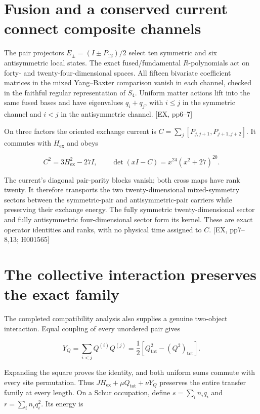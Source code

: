\section{Fusion and a conserved current connect composite channels}\label{fusion-and-a-conserved-current-connect-composite-channels}

The pair projectors \(E_\pm=(I\pm P_{12})/2\) select ten symmetric and six antisymmetric local states. The exact fused/fundamental \(R\)-polynomials act on forty- and twenty-four-dimensional spaces. All fifteen bivariate coefficient matrices in the mixed Yang--Baxter comparison vanish in each channel, checked in the faithful regular representation of \(S_4\). Uniform matter actions lift into the same fused bases and have eigenvalues \(q_i+q_j\), with \(i\le j\) in the symmetric channel and \(i<j\) in the antisymmetric channel. {[}EX, pp6--7{]}

On three factors the oriented exchange current is \(C=\sum_j[P_{j,j+1},P_{j+1,j+2}]\). It commutes with \(H_{\mathrm{ex}}\) and obeys

\[
C^2=3H_{\mathrm{ex}}^2-27I,\qquad\det(xI-C)=x^{24}(x^2+27)^{20}.
\]

The current's diagonal pair-parity blocks vanish; both cross maps have rank twenty. It therefore transports the two twenty-dimensional mixed-symmetry sectors between the symmetric-pair and antisymmetric-pair carriers while preserving their exchange energy. The fully symmetric twenty-dimensional sector and fully antisymmetric four-dimensional sector form its kernel. These are exact operator identities and ranks, with no physical time assigned to \(C\). {[}EX, pp7--8,13; H001565{]}

\section{The collective interaction preserves the exact family}\label{the-collective-interaction-preserves-the-exact-family}

The completed compatibility analysis also supplies a genuine two-object interaction. Equal coupling of every unordered pair gives

\[
Y_Q=\sum_{i<j}Q^{(i)}Q^{(j)}=\frac12\left[Q_{\mathrm{tot}}^2-(Q^2)_{\mathrm{tot}}\right].
\]

Expanding the square proves the identity, and both uniform sums commute with every site permutation. Thus \(JH_{\mathrm{ex}}+\mu Q_{\mathrm{tot}}+\nu Y_Q\) preserves the entire transfer family at every length. On a Schur occupation, define \(s=\sum_i n_iq_i\) and \(r=\sum_i n_iq_i^2\). Its energy is

